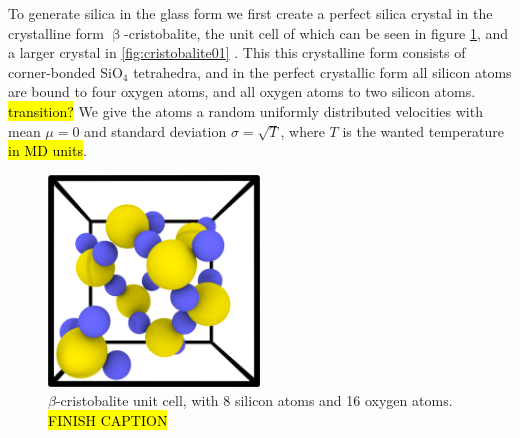 To generate silica in the glass form we first create a perfect silica crystal in the crystalline form $\upbeta$-cristobalite, the unit cell of which can be seen in figure \cref{fig:beta_cristobalite-unit_cell}, and a larger crystal in \cref{fig:cristobalite01} . This this crystalline form consists of corner-bonded SiO$_4$ tetrahedra, and in the perfect crystallic form all silicon atoms are bound to four oxygen atoms, and all oxygen atoms to two silicon atoms. \hl{transition?} We give the atoms a random uniformly distributed velocities with mean $\mu = 0$ and standard deviation $\sigma = \sqrt{T}$, where $T$ is the wanted temperature \hl{in MD units}.
%
\begin{figure}[htpb]%
    \centering%
    \includegraphics[width=0.5\textwidth]{images/beta_cristobalite/unit_cell05_cropped.png}%
    \caption{%
        $\beta$-cristobalite unit cell, with 8 silicon atoms and 16 oxygen atoms. \hl{FINISH CAPTION}%
    }%
    \label{fig:beta_cristobalite-unit_cell}%
\end{figure}%

